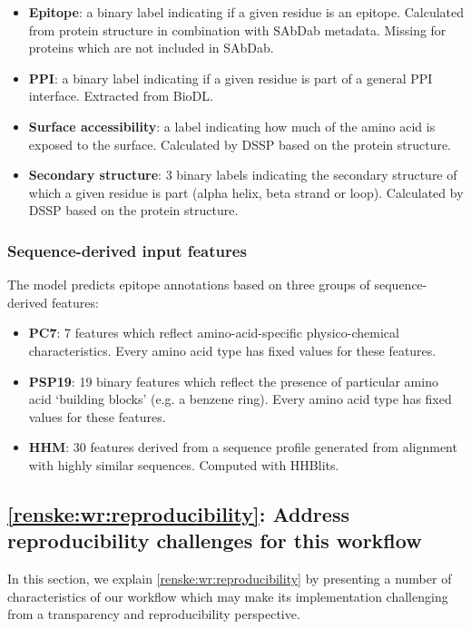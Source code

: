 \begin{itemize}
    \item \textbf{Epitope}: a binary label indicating if a given residue is an epitope. Calculated from protein structure in combination with SAbDab metadata. Missing for proteins which are not included in SAbDab.
    \item \textbf{PPI}: a binary label indicating if a given residue is part of a general PPI interface. Extracted from BioDL.
    \item \textbf{Surface accessibility}: a label indicating how much of the amino acid is exposed to the surface. Calculated by DSSP \cite{kabschDictionaryProteinSecondary1983} based on the protein structure.
    \item \textbf{Secondary structure}: 3 binary labels indicating the secondary structure of which a given residue is part (alpha helix, beta strand or loop). Calculated by DSSP based on the protein structure. 
\end{itemize}

\subsubsection{Sequence-derived input features}
The model predicts epitope annotations based on three groups of sequence-derived features:
\begin{itemize}
    \item \textbf{PC7}: 7 features which reflect amino-acid-specific physico-chemical characteristics. Every amino acid type has fixed values for these features.
    \item \textbf{PSP19}: 19 binary features which reflect the presence of particular amino acid `building blocks' (e.g. a benzene ring). Every amino acid type has fixed values for these features.
    \item \textbf{HHM}: 30 features derived from a sequence profile generated from alignment with highly similar sequences. Computed with HHBlits.
\end{itemize}

\subsection{\ref{renske:wr:reproducibility}: Address reproducibility challenges for this workflow}
\label{sec:renske:wf_reproducibility}

In this section, we explain \ref{renske:wr:reproducibility} by presenting a number of characteristics of our workflow which may make its implementation challenging from a transparency and reproducibility perspective.

